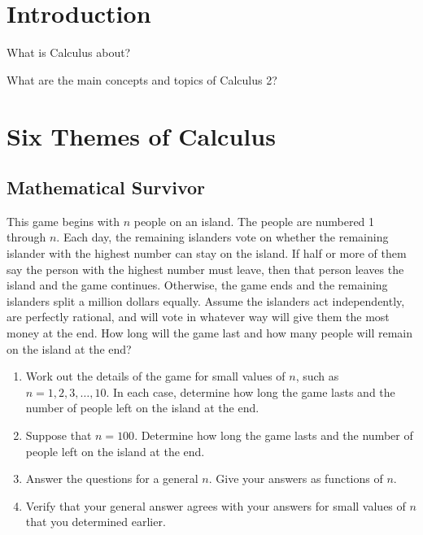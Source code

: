 \documentclass[12pt]{article}
\begin{document}


\newpage


\section{Introduction}


\noindent What is Calculus about?  

\noindent What are the main concepts and topics of Calculus 2?

\section{Six Themes of Calculus}

\subsection{Mathematical Survivor} 



\vspace*{.2in}

\noindent This game begins with $n$ people on an island.  The people are numbered 1 through $n$.  Each day, the remaining islanders vote on whether the remaining islander with the highest number can stay on the island.  If half or more of them say the person with the highest number must leave, then that person leaves the island and the game continues.  Otherwise, the game ends and the remaining islanders split a million dollars equally.  Assume the islanders act independently, are perfectly rational, and will vote in whatever way will give them the most money at the end.  How long will the game last and how many people will remain on the island at the end?


\begin{enumerate}
  
\item Work out the details of the game for small values of $n$, such as $n=1, 2, 3, \dots, 10$.  In each case, determine how long the game lasts and the number of people left on the island at the end.

\item Suppose that $n=100$.  Determine how long the game lasts and the number of people left on the island at the end.

\item Answer the questions for a general $n$.  Give your answers as functions of $n$.

\item Verify that your general answer agrees with your answers for small values of $n$ that you determined earlier. 


\end{enumerate}
\end{document}
